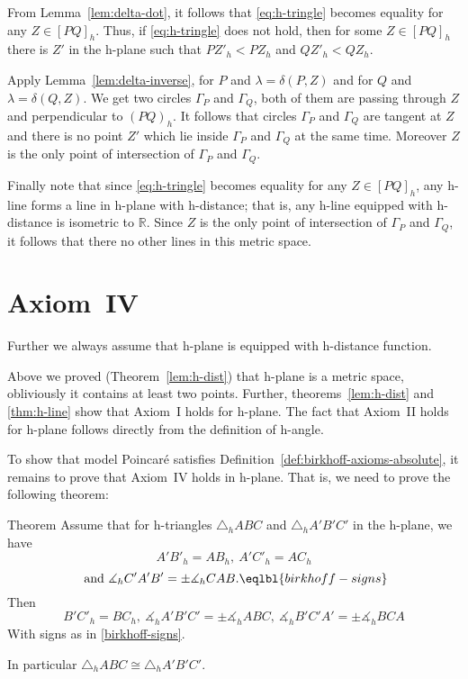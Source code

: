 {From Lemma~\ref{lem:delta-dot}, it follows that \ref{eq:h-tringle} becomes equality for any $Z\in[PQ]_h$.
Thus, if \ref{eq:h-tringle} does not hold, then for some $Z\in[PQ]_h$ there is $Z'$ in the h-plane such that $PZ'_h<PZ_h$ and $QZ'_h<QZ_h$.

Apply Lemma~\ref{lem:delta-inverse}, for $P$ and $\lambda=\delta(P,Z)$ and for $Q$ and $\lambda=\delta(Q,Z)$.
We get two circles $\Gamma_P$ and $\Gamma_Q$,
both of them are passing through $Z$ and perpendicular to $(PQ)_h$.
It follows that circles $\Gamma_P$ and $\Gamma_Q$ are tangent at $Z$
and there is no point $Z'$ which lie inside $\Gamma_P$ and $\Gamma_Q$ at the same time.
Moreover $Z$ is the only point of intersection of $\Gamma_P$ and $\Gamma_Q$.

Finally note that since \ref{eq:h-tringle} becomes equality for any $Z\in[PQ]_h$, 
any h-line forms a line in h-plane with h-distance;
that is, any h-line equipped with h-distance is isometric to $\mathbb{R}$. 
Since $Z$ is the only point of intersection of $\Gamma_P$ and $\Gamma_Q$, it follows that there no other lines in this metric space.
\qeds
 
\section*{Axiom~IV}

Further we always assume that h-plane is equipped with h-distance function.

Above we proved (Theorem~\ref{lem:h-dist}) that h-plane is a metric space, obliviously it contains at least two points.
Further, theorems~\ref{lem:h-dist} and \ref{thm:h-line} show that Axiom~I holds for h-plane.
The fact that Axiom~II holds for h-plane follows directly from the definition of h-angle.

To show that model Poincar\'e satisfies Definition~\ref{def:birkhoff-axioms-absolute},
it remains to prove that Axiom~IV holds in h-plane.
That is, we need to prove the following theorem:

\begin{thm}{Theorem}
Assume that for h-triangles $\triangle_h A B C$ and $\triangle_h A' B' C'$ in the h-plane, we have
$$A' B'_h= A B_h,
\ A' C'_h= A C_h$$
$$\ \text{and}\ 
\measuredangle_h C' A' B'=\pm\measuredangle_h C A B.\eqlbl{birkhoff-signs}$$
Then 
$$ B' C'_h= B C_h,
\ \measuredangle_h A' B' C'=\pm\measuredangle_h A B C,
\ \measuredangle_h B' C' A'=\pm\measuredangle_h B  C A $$
With signs as in \ref{birkhoff-signs}.

In particular $\triangle_h A B C\cong\triangle_h A' B' C'$.
\end{thm}


}
